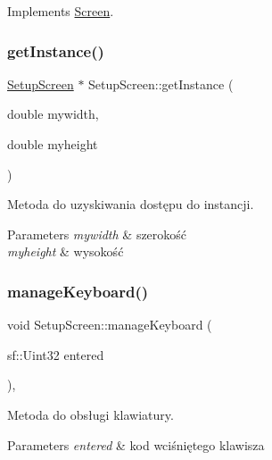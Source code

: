 Implements \mbox{\hyperlink{class_screen_ab9f74bb4bf0d0ee2a8280354ba0ff85e}{Screen}}.

\mbox{\label{class_setup_screen_aa107ca15f6dee4a39b59c993e919cc56}} 
\subsubsection{\texorpdfstring{getInstance()}{getInstance()}}
{\footnotesize\ttfamily \mbox{\hyperlink{class_setup_screen}{Setup\+Screen}} $\ast$ Setup\+Screen\+::get\+Instance (\begin{DoxyParamCaption}\item[{double}]{mywidth,  }\item[{double}]{myheight }\end{DoxyParamCaption})\hspace{0.3cm}{\ttfamily [static]}}



Metoda do uzyskiwania dostępu do instancji. 


\begin{DoxyParams}{Parameters}
{\em mywidth} & szerokość \\
\hline
{\em myheight} & wysokość \\
\hline
\end{DoxyParams}
\mbox{\label{class_setup_screen_ac1b4b500907cf569e58a6a98f082e8d2}} 
\subsubsection{\texorpdfstring{manageKeyboard()}{manageKeyboard()}}
{\footnotesize\ttfamily void Setup\+Screen\+::manage\+Keyboard (\begin{DoxyParamCaption}\item[{sf\+::\+Uint32}]{entered }\end{DoxyParamCaption})\hspace{0.3cm}{\ttfamily [override]}, {\ttfamily [virtual]}}



Metoda do obsługi klawiatury. 


\begin{DoxyParams}{Parameters}
{\em entered} & kod wciśniętego klawisza \\
\hline
\end{DoxyParams}


